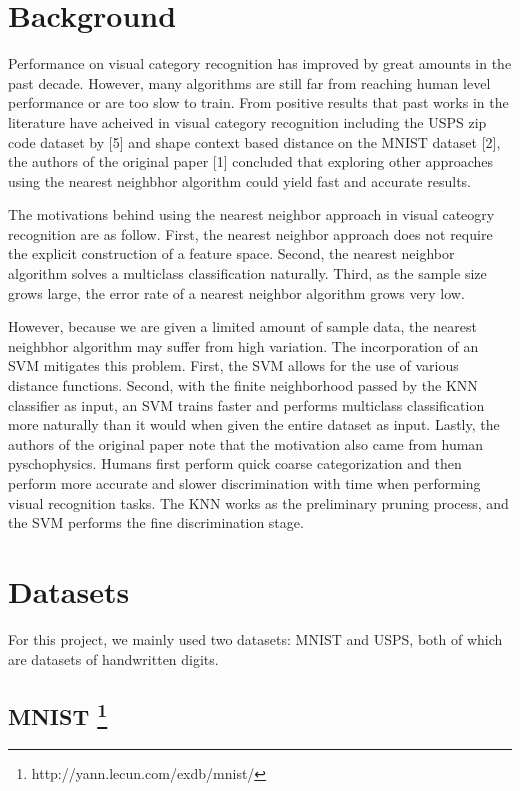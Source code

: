 \documentclass[11pt,letterpaper]{article}
\begin{document}
\section{Background}

Performance on visual category recognition has improved by great amounts in the past decade. However, many algorithms are still far from reaching human level performance or are too slow to train. From positive results that past works in the literature have acheived in visual category recognition including the USPS zip code dataset by [5] and shape context based distance on the MNIST dataset [2], the authors of the original paper [1] concluded that exploring other approaches using the nearest neighbhor algorithm could yield fast and accurate results.

The motivations behind using the nearest neighbor approach in visual cateogry recognition are as follow. First, the nearest neighbor approach does not require the explicit construction of a feature space. Second, the nearest neighbor algorithm solves a multiclass classification naturally. Third, as the sample size grows large, the error rate of a nearest neighbor algorithm grows very low.

However, because we are given a limited amount of sample data, the nearest neighbhor algorithm may suffer from high variation. The incorporation of an SVM mitigates this problem. First, the SVM allows for the use of various distance functions. Second, with the finite neighborhood passed by the KNN classifier as input, an SVM trains faster and performs multiclass classification more naturally than it would when given the entire dataset as input. Lastly, the authors of the original paper note that the motivation also came from human pyschophysics. Humans first perform quick coarse categorization and then perform more accurate and slower discrimination with time when performing visual recognition tasks. The KNN works as the preliminary pruning process, and the SVM performs the fine discrimination stage.

\section{Datasets}

For this project, we mainly used two datasets: MNIST and USPS, both of which are datasets of handwritten digits.

\subsection{MNIST \footnote{http://yann.lecun.com/exdb/mnist/}}
\end{document}
